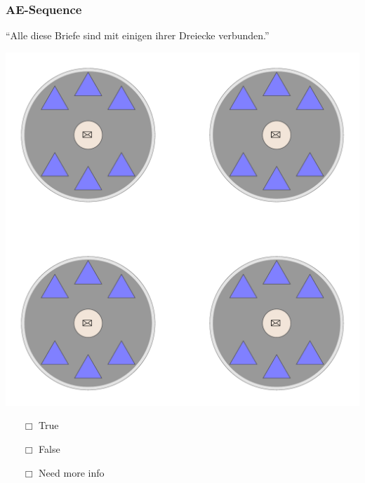 \documentclass[fleqn,10pt,serif,xcolor=dvipsnames]{beamer}
\renewcommand{\AE}{AE\xspace}
\newcommand{\mymark}[1]{{\color{blue}{#1}}}
\begin{document}
\begin{frame}
  \frametitle{\AE-Sequence}
  \begin{center}
    ``Alle diese Briefe sind mit einigen ihrer Dreiecke verbunden.''

    \vspace{0.1cm}

    \includegraphics[width=0.5 \textwidth]{../../pictures/ae_01_1.pdf}

    \vspace{0.1cm}

    \begin{multicols}{3}
      \begin{itemize} 
      \item[$\Box$] True\\
        \onslide<2>{$\leadsto$  \mymark{false}}
      \item[$\Box$] False\\
        \onslide<2>{$\leadsto$ \mymark{false}}
      \item[$\Box$] Need more info 
      \end{itemize}
    \end{multicols}

  \end{center}
\end{frame}
\end{document}
